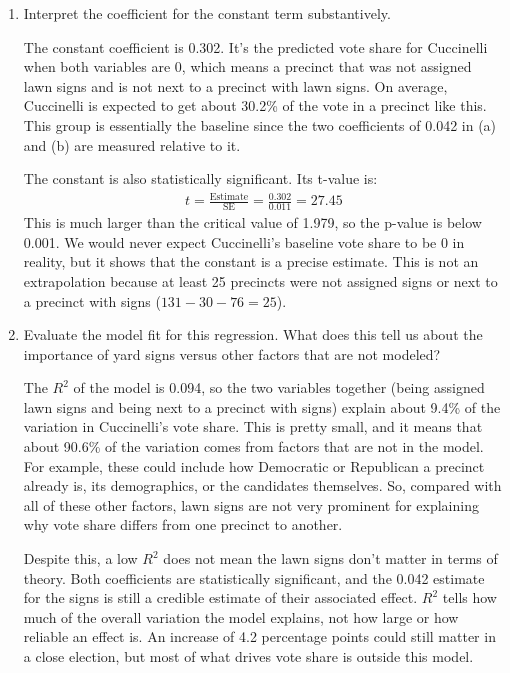 \documentclass[12pt,letterpaper]{article}
\begin{document}
\begin{enumerate}
		\vspace{2cm}
		\item [(c)] Interpret the coefficient for the constant term substantively.
		\vspace{.25cm}
		
		\noindent The constant coefficient is 0.302. It's the predicted vote share for Cuccinelli when both variables are 0, which means a precinct that was not assigned lawn signs and is not next to a precinct with lawn signs. On average, Cuccinelli is expected to get about 30.2\% of the vote in a precinct like this. This group is essentially the baseline since the two coefficients of 0.042 in (a) and (b) are measured relative to it.
		
		\noindent The constant is also statistically significant. Its t-value is:
		\begin{align*}
			t = \frac{\text{Estimate}}{\text{SE}} = \frac{0.302}{0.011} = 27.45
		\end{align*}
		\noindent This is much larger than the critical value of 1.979, so the p-value is below 0.001. We would never expect Cuccinelli's baseline vote share to be 0 in reality, but it shows that the constant is a precise estimate. This is not an extrapolation because at least 25 precincts were not assigned signs or next to a precinct with signs ($131 - 30 - 76 = 25$). 
		\vspace{2cm}
		
		\item [(d)] Evaluate the model fit for this regression.  What does this tell us about the importance of yard signs versus other factors that are not modeled?
		\vspace{.25cm}
		
		\noindent The $R^2$ of the model is 0.094, so the two variables together (being assigned lawn signs and being next to a precinct with signs) explain about 9.4\% of the variation in Cuccinelli's vote share. This is pretty small, and it means that about 90.6\% of the variation comes from factors that are not in the model. For example, these could include how Democratic or Republican a precinct already is, its demographics, or the candidates themselves. So, compared with all of these other factors, lawn signs are not very prominent for explaining why vote share differs from one precinct to another.
		\vspace{.25cm}
		
		\noindent Despite this, a low $R^2$ does not mean the lawn signs don't matter in terms of theory. Both coefficients are statistically significant, and the 0.042 estimate for the signs is still a credible estimate of their associated effect. $R^2$ tells how much of the overall variation the model explains, not how large or how reliable an effect is. An increase of 4.2 percentage points could still matter in a close election, but most of what drives vote share is outside this model.
		
	\end{enumerate}  
	
	
\end{document}
